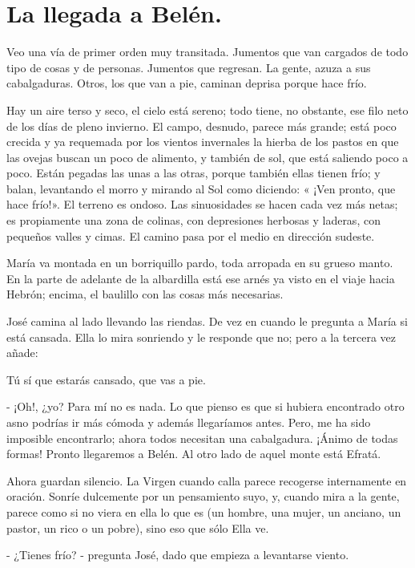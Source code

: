 \documentclass[12pt, twoside, openright]{book} %
\begin{document}
\chapter*{La llegada a Belén.}

Veo una vía de primer orden muy transitada. Jumentos que van cargados de todo tipo de cosas y de personas. Jumentos que regresan. La gente, azuza a sus cabalgaduras. Otros, los que van a pie, caminan deprisa porque hace frío. 

Hay un aire terso y seco, el cielo está sereno; todo tiene, no obstante, ese filo neto de los días de pleno invierno. El campo, desnudo, parece más grande; está poco crecida y ya requemada por los vientos invernales la hierba de los pastos en que las ovejas buscan un poco de alimento, y también de sol, que está saliendo poco a poco. Están pegadas las unas a las otras, porque también ellas tienen frío; y balan, levantando el morro y mirando al Sol como diciendo: « ¡Ven pronto, que hace frío!». El terreno es ondoso. Las sinuosidades se hacen cada vez más netas; es propiamente una zona de colinas, con depresiones herbosas y laderas, con pequeños valles y cimas. El camino pasa por el medio en dirección sudeste. 

María va montada en un borriquillo pardo, toda arropada en su grueso manto. En la parte de adelante de la albardilla está ese arnés ya visto en el viaje hacia Hebrón; encima, el baulillo con las cosas más necesarias. 

José camina al lado llevando las riendas. De vez en cuando le pregunta a María si está cansada. Ella lo mira sonriendo y le responde que no; pero a la tercera vez añade: 

Tú sí que estarás cansado, que vas a pie. 

- ¡Oh!, ¿yo? Para mí no es nada. Lo que pienso es que si hubiera encontrado otro asno podrías ir más cómoda y además llegaríamos antes. Pero, me ha sido imposible encontrarlo; ahora todos necesitan una cabalgadura. ¡Ánimo de todas formas! Pronto llegaremos a Belén. Al otro lado de aquel monte está Efratá. 

Ahora guardan silencio. La Virgen cuando calla parece recogerse internamente en oración. Sonríe dulcemente por un pensamiento suyo, y, cuando mira a la gente, parece como si no viera en ella lo que es (un hombre, una mujer, un anciano, un pastor, un rico o un pobre), sino eso que sólo Ella ve. 

- ¿Tienes frío? - pregunta José, dado que empieza a levantarse viento. 
\end{document}
